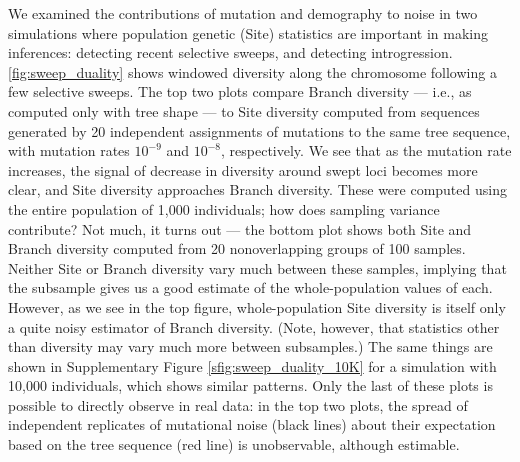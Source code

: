 \documentclass[9pt,twoside,lineno]{gsajnl}
\begin{document}
We examined the contributions of mutation and demography to noise
in two simulations where population genetic (Site) statistics
are important in making inferences:
detecting recent selective sweeps,
and detecting introgression.
\autoref{fig:sweep_duality} shows windowed
diversity along the chromosome following a few selective sweeps.
The top two plots compare Branch diversity --- i.e., as computed only with tree shape ---
to Site diversity computed from sequences generated by 20 independent assignments of mutations to the same tree sequence,
with mutation rates $10^{-9}$ and $10^{-8}$, respectively.
We see that as the mutation rate increases, the signal of decrease in diversity around swept loci becomes more clear,
and Site diversity approaches Branch diversity.
These were computed using the entire population of 1,000 individuals;
how does sampling variance contribute?
Not much, it turns out --- the bottom plot shows both Site and Branch diversity
computed from 20 nonoverlapping groups of 100 samples.
Neither Site or Branch diversity vary much between these samples,
implying that the subsample gives us a good estimate of the whole-population values of each.
However, as we see in the top figure,
whole-population Site diversity is itself only a quite noisy estimator of Branch diversity.
(Note, however, that statistics other than diversity may vary much more between subsamples.)
The same things are shown in Supplementary Figure \ref{sfig:sweep_duality_10K}
for a simulation with 10,000 individuals, which shows similar patterns.
Only the last of these plots is possible to directly observe in real data:
in the top two plots,
the spread of independent replicates of mutational noise (black lines)
about their expectation based on the tree sequence (red line)
is unobservable, although estimable.
\end{document}
